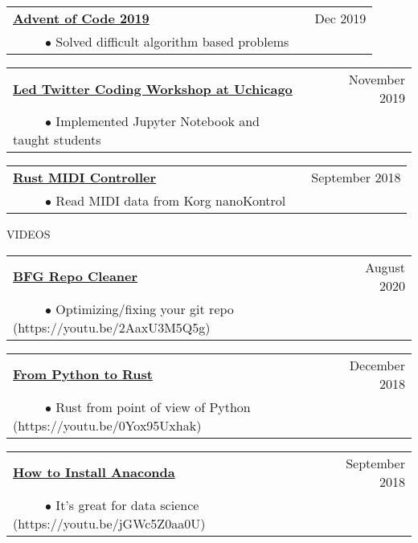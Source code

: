 \documentclass[11pt]{article}
\begin{document}
\begin{tabularx}{\linewidth}{l X r}
\textbf{\href{https://github.com/silverdrake11/advent_of_code_2019_kevin}{Advent of Code 2019}} & & Dec 2019  \\
~~~~~$\bullet$ Solved difficult algorithm based problems\\
\end{tabularx}

\begin{tabularx}{\linewidth}{l X r}
\textbf{\href{https://github.com/silverdrake11/twitter_uchicago_workshop}{Led Twitter Coding Workshop at Uchicago}} & & November 2019 \\
~~~~~$\bullet$ Implemented Jupyter Notebook and taught students\\
\end{tabularx}

\begin{tabularx}{\linewidth}{l X r}
\textbf{\href{https://github.com/silverdrake11/rustkontrol/blob/master/src/main.rs}{Rust MIDI Controller}} & & September 2018 \\
~~~~~$\bullet$ Read MIDI data from Korg nanoKontrol\\
\end{tabularx}




\vspace {.8cm}

{VIDEOS}
\vspace {0.4cm}


\begin{tabularx}{\linewidth}{l X r}
\textbf{\href{https://www.youtube.com/watch?v=2AaxU3M5Q5g\&t=1903s}{BFG Repo Cleaner}} & & August 2020 \\
~~~~~$\bullet$ Optimizing/fixing your git repo (https://youtu.be/2AaxU3M5Q5g)\\
\end{tabularx}

\begin{tabularx}{\linewidth}{l X r}
\textbf{\href{https://youtu.be/0Yox95Uxhak}{From Python to Rust}} & & December 2018 \\
~~~~~$\bullet$ Rust from point of view of Python (https://youtu.be/0Yox95Uxhak)\\
\end{tabularx}

\begin{tabularx}{\linewidth}{l X r}
\textbf{\href{https://youtu.be/jGWc5Z0aa0U}{How to Install Anaconda}} & & September 2018 \\
~~~~~$\bullet$ It's great for data science (https://youtu.be/jGWc5Z0aa0U)\\
\end{tabularx}
\end{document}
